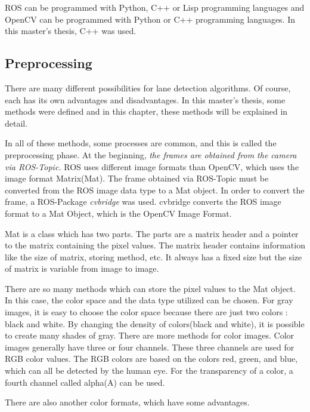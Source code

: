 ROS can be programmed with Python, C++ or Lisp programming languages and OpenCV can be programmed with Python or C++ programming languages. In this master's thesis, C++ was used.

%
\subsection{Preprocessing}\label{sec:Preprocessing}

There are many different possibilities for lane detection algorithms. Of course, each has its own advantages and disadvantages. In this master's thesis, some methods were defined and in this chapter, these methods will be explained in detail.

In all of these methods, some processes are common, and this is called the preprocessing phase. At the beginning,\emph{\color{blue} the frames are obtained from the camera via ROS-Topic.} ROS uses different image formats than OpenCV, which uses the image format Matrix(Mat). The frame obtained via ROS-Topic must be converted from the ROS image data type to a Mat object. In order to convert the frame, a ROS-Package \textit{cvbridge}\cite{cv_bridge} was used. cvbridge converts the ROS image format to a Mat Object, which is the OpenCV Image Format. 

Mat is a class which has two parts. The parts are a matrix header and a pointer to the matrix containing the pixel values. The matrix header contains information like the size of matrix, storing method, etc. It always has a fixed size but the size of matrix is variable from image to image.

There are so many methods which can store the pixel values to the Mat object. In this case, the color space and the data type utilized can be chosen. For gray images, it is easy to choose the color space because there are just two colors : black and white. By changing the density of colors(black and white), it is possible to create many shades of gray. There are more methods for color images. Color images generally have three or four channels. These three channels are used for RGB color values. The RGB colors are based on the colors red, green, and blue, which can all be detected by the human eye. For the transparency of a color, a fourth channel called alpha(A) can be used.

There are also another color formats, which have some advantages\cite{OpenCV_Mat}. 

